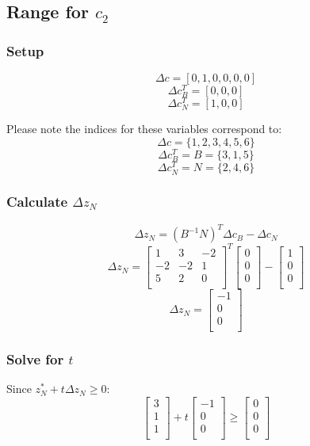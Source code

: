 \documentclass[14pt]{extarticle}
\begin{document}
\subsection*{Range for $c_2$}
\subsubsection*{Setup}
\[
    \Delta c = [0, 1, 0, 0, 0, 0]
\]
\[
    \Delta c^T_B = [0, 0, 0]
\]
\[
    \Delta c^T_N = [1, 0, 0]
\]

\bigskip Please note the indices for these variables correspond to:
\[
    \Delta c = \{1, 2, 3, 4, 5, 6\}
\]
\[
    \Delta c^T_B = B = \{3, 1, 5\}
\]
\[
    \Delta c^T_N = N = \{2, 4, 6\}
\]

\subsubsection*{Calculate $\Delta z_N$}
\[
    \Delta z_N = (B^{-1}N)^T \Delta c_B - \Delta c_N
\]
\[
    \Delta z_N = \begin{bmatrix}
        1 & 3 & -2 \\
        -2 & -2 & 1 \\
        5 & 2 & 0 \\
    \end{bmatrix}^T
    \begin{bmatrix}
        0 \\
        0 \\
        0 \\
    \end{bmatrix}
    - \begin{bmatrix}
        1 \\
        0 \\
        0 \\
    \end{bmatrix}
\]
\[
    \Delta z_N = \begin{bmatrix}
        -1 \\
        0 \\
        0 \\
    \end{bmatrix}
\]

\subsubsection*{Solve for $t$}
Since $z^*_N + t\Delta z_N \geq 0$:
\[
    \begin{bmatrix}
        3 \\
        1 \\
        1 \\
    \end{bmatrix}
    + t \begin{bmatrix}
        -1 \\
        0 \\
        0 \\
    \end{bmatrix}
    \geq \begin{bmatrix}
        0 \\
        0 \\
        0 \\
    \end{bmatrix}
\]
\end{document}
